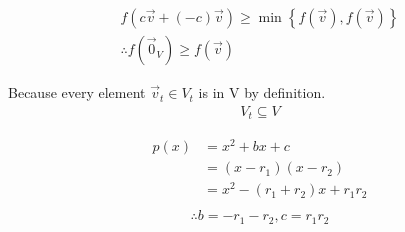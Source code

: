 \documentclass[1]{mathtoolkit}
\begin{document}
\begin{p}
  \item
    \begin{subp}
      \item
        \begin{gather}
          f(c \vec{v} + (-c) \vec{v}) \ge \min \left\{ f(\vec{v}), f(\vec{v}) \right\} \\
          \therefore f(\vec{0}_V) \ge f(\vec{v})
        \end{gather}
      \item
        Because every element $\vec{v}_t \in V_t$ is in V by definition.
        \begin{gather}
          V_t \subseteq V
        \end{gather}
    \end{subp}

  \item
    \begin{align}
      p(x) & = x^2 + bx +c \\
           & = (x - r_1) (x - r_2) \\
           & = x^2 - (r_1 + r_2) x + r_1 r_2 \\
    \end{align}
    \begin{gather}
      \therefore b = - r_1 - r_2, c = r_1 r_2 \\
    \end{gather}


\end{p}
\end{document}
